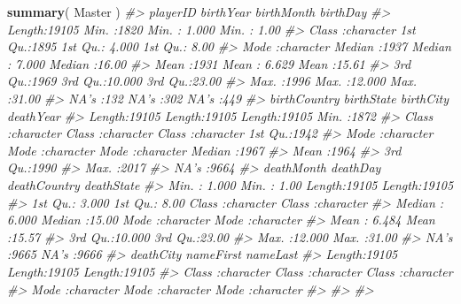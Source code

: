\documentclass[]{book}
\newenvironment{Shaded}{\begin{snugshade}}{\end{snugshade}}
\newcommand{\CommentTok}[1]{\textcolor[rgb]{0.56,0.35,0.01}{\textit{#1}}}
\newcommand{\KeywordTok}[1]{\textcolor[rgb]{0.13,0.29,0.53}{\textbf{#1}}}
\newcommand{\NormalTok}[1]{#1}
\theoremstyle{definition}
\theoremstyle{definition}
\theoremstyle{definition}
\theoremstyle{remark}
\begin{document}
\begin{Shaded}
\begin{Highlighting}[]
\KeywordTok{summary}\NormalTok{( Master )}
\CommentTok{#>    playerID           birthYear      birthMonth        birthDay    }
\CommentTok{#>  Length:19105       Min.   :1820   Min.   : 1.000   Min.   : 1.00  }
\CommentTok{#>  Class :character   1st Qu.:1895   1st Qu.: 4.000   1st Qu.: 8.00  }
\CommentTok{#>  Mode  :character   Median :1937   Median : 7.000   Median :16.00  }
\CommentTok{#>                     Mean   :1931   Mean   : 6.629   Mean   :15.61  }
\CommentTok{#>                     3rd Qu.:1969   3rd Qu.:10.000   3rd Qu.:23.00  }
\CommentTok{#>                     Max.   :1996   Max.   :12.000   Max.   :31.00  }
\CommentTok{#>                     NA's   :132    NA's   :302      NA's   :449    }
\CommentTok{#>  birthCountry        birthState         birthCity           deathYear   }
\CommentTok{#>  Length:19105       Length:19105       Length:19105       Min.   :1872  }
\CommentTok{#>  Class :character   Class :character   Class :character   1st Qu.:1942  }
\CommentTok{#>  Mode  :character   Mode  :character   Mode  :character   Median :1967  }
\CommentTok{#>                                                           Mean   :1964  }
\CommentTok{#>                                                           3rd Qu.:1990  }
\CommentTok{#>                                                           Max.   :2017  }
\CommentTok{#>                                                           NA's   :9664  }
\CommentTok{#>    deathMonth        deathDay     deathCountry        deathState       }
\CommentTok{#>  Min.   : 1.000   Min.   : 1.00   Length:19105       Length:19105      }
\CommentTok{#>  1st Qu.: 3.000   1st Qu.: 8.00   Class :character   Class :character  }
\CommentTok{#>  Median : 6.000   Median :15.00   Mode  :character   Mode  :character  }
\CommentTok{#>  Mean   : 6.484   Mean   :15.57                                        }
\CommentTok{#>  3rd Qu.:10.000   3rd Qu.:23.00                                        }
\CommentTok{#>  Max.   :12.000   Max.   :31.00                                        }
\CommentTok{#>  NA's   :9665     NA's   :9666                                         }
\CommentTok{#>   deathCity          nameFirst           nameLast        }
\CommentTok{#>  Length:19105       Length:19105       Length:19105      }
\CommentTok{#>  Class :character   Class :character   Class :character  }
\CommentTok{#>  Mode  :character   Mode  :character   Mode  :character  }
\CommentTok{#>                                                          }
\CommentTok{#>                                                          }
\CommentTok{#>                                                          }

\end{Highlighting}
\end{Shaded}
\end{document}

